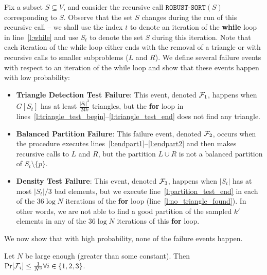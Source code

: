 \documentclass[11pt]{llncs}
\newcommand{\RS}{{\texttt{ROBUST-SORT}}}
\begin{document}
Fix a subset $S \subseteq V$, and consider the recursive call $\RS(S)$ corresponding to $S$. Observe that the set $S$ changes during the run of this recursive call -- we shall use the index $t$ to denote an iteration of the {\bf while} loop in line~\ref{l:while} and use $S_t$ to denote the set $S$ during this iteration. Note that each iteration of the while loop either ends with the removal of a triangle or with recursive calls to smaller subproblems ($L$ and $R$).
We define several failure events with respect to an iteration of the while loop and show that these events happen with low probability: 
\begin{itemize}
\item {\bf Triangle Detection Test Failure}: This event, denoted ${\cal F}_1$, happens when $G[S_t]$ has at least $\frac{|S_t|^3}{24 k}$ triangles, but the {\bf for} loop in lines~\ref{l:triangle_test_begin}--\ref{l:triangle_test_end} does not find any triangle. 

\item {\bf Balanced Partition Failure}: This failure event, denoted ${\cal F}_2$, occurs when the procedure executes lines~\ref{l:endpart1}--\ref{l:endpart2} and then makes recursive calls to $L$ and $R$, but the partition $L \cup R$ is not a balanced partition of $S_t \setminus \{p\}$.  

\item {\bf Density Test Failure}: This event, denoted ${\cal F}_3$, happens when $|S_t|$ has at most $|S_t|/3$ bad elements, but we execute line~\ref{l:partition_test_end} in each of the $36 \log N$ iterations of the {\bf for} loop (line~\ref{l:no_triangle_found}). In other words, we are not able to find a good partition of the sampled $k'$ elements in any of the $36 \log N$ iterations of this {\bf for} loop. 
\end{itemize}
We now show that with high probability, none of the failure events happen. 
\begin{lemma}
    \label{lem:nofailure}
    Let $N$ be large enough (greater than some constant). Then
    $\Pr[{\cal F}_i] \leq \frac{1}{N^3} \forall i \in \{1, 2, 3\}$.
\end{lemma}
\end{document}
